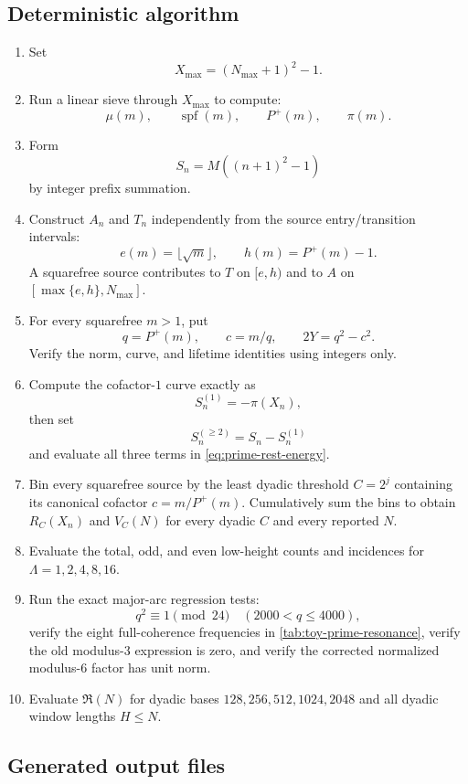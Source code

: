 \documentclass[11pt]{article}
\theoremstyle{definition}
\newcommand{\Pplus}{P^{+}}
\newcommand{\1}{\mathbf{1}}
\begin{document}
\subsection{Deterministic algorithm}

\begin{enumerate}[leftmargin=1.7em,itemsep=0.3em]
\item Set
\[
 X_{\max}=(N_{\max}+1)^2-1.
\]
\item Run a linear sieve through $X_{\max}$ to compute:
\[
 \mu(m),\qquad
 \operatorname{spf}(m),\qquad
 \Pplus(m),\qquad
 \pi(m).
\]
\item Form
\[
 S_n=M((n+1)^2-1)
\]
by integer prefix summation.
\item Construct $A_n$ and $T_n$ independently from the source entry/transition intervals:
\[
 e(m)=\lfloor\sqrt m\rfloor,
 \qquad
 h(m)=\Pplus(m)-1.
\]
A squarefree source contributes to $T$ on $[e,h)$ and to $A$ on $[\max\{e,h\},N_{\max}]$.
\item For every squarefree $m>1$, put
\[
 q=\Pplus(m),
 \qquad
 c=m/q,
 \qquad
 2Y=q^2-c^2.
\]
Verify the norm, curve, and lifetime identities using integers only.
\item Compute the cofactor-$1$ curve exactly as
\[
 S_n^{(1)}=-\pi(X_n),
\]
then set
\[
 S_n^{(\ge2)}=S_n-S_n^{(1)}
\]
and evaluate all three terms in \cref{eq:prime-rest-energy}.
\item Bin every squarefree source by the least dyadic threshold $C=2^j$ containing its canonical cofactor $c=m/\Pplus(m)$.  Cumulatively sum the bins to obtain $R_C(X_n)$ and $V_C(N)$ for every dyadic $C$ and every reported $N$.
\item Evaluate the total, odd, and even low-height counts and incidences for $\Lambda=1,2,4,8,16$.
\item Run the exact major-arc regression tests:
\[
 q^2\equiv1\pmod{24}\quad(2000<q\le4000),
\]
verify the eight full-coherence frequencies in \cref{tab:toy-prime-resonance}, verify the old modulus-$3$ expression is zero, and verify the corrected normalized modulus-$6$ factor has unit norm.
\item Evaluate $\mathfrak R(N)$ for dyadic bases $128,256,512,1024,2048$ and all dyadic window lengths $H\le N$.
\end{enumerate}

\subsection{Generated output files}
\end{document}
